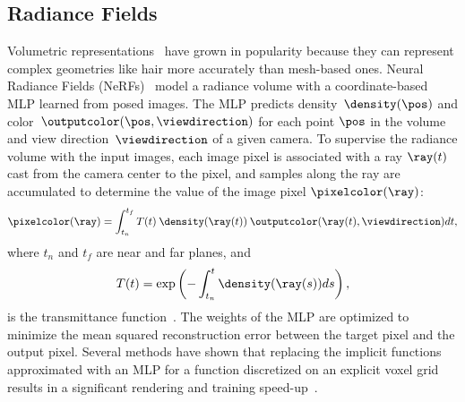   \subsection{Radiance Fields}
    Volumetric representations~\cite{vicini2021nonexponential} have grown in
    popularity because they can represent complex geometries like hair more
    accurately than mesh-based ones.
    Neural Radiance Fields (NeRFs)~\cite{mildenhall2020nerf} model a radiance
    volume with a coordinate-based MLP learned from posed images.
    The MLP predicts density~$\density(\pos)$ and color~$\outputcolor(\pos,
    \viewdirection)$ for each point $\pos$ in the volume and view
    direction~$\viewdirection$ of a given camera.
    To supervise the radiance volume with the input images, each image pixel is associated with a ray $\ray(t)$ cast from the camera center to the pixel, and samples along the ray are accumulated to determine the value of the image pixel $\pixelcolor(\ray)$:
    \begin{equation}
      \label{eq:blendfields-rendering-equation}
      \pixelcolor(\ray)=\int^{t_f}_{t_n}T(t)\:\density(\ray(t))\:\outputcolor(\ray(t), \viewdirection)dt,
    \end{equation}
    where $t_n$ and $t_f$ are near and far planes, and
    \begin{equation}
      T(t) = \exp\left(-\int^t_{t_n}\density(\ray(s))ds\right) ,
      \end{equation} is the transmittance
      function~\cite{tagliasacchi2022volume}.
    The weights of the MLP are optimized to minimize the mean squared
    reconstruction error between the target pixel and the output pixel.
    Several methods have shown that replacing the implicit functions
    approximated with an MLP for a function discretized on an explicit voxel
    grid results in a significant rendering and training
    speed-up~\cite{garbin2021fastnerf, hedman2021baking, yu2021plenoctrees,
    sun2021direct, liu2020neural}.

